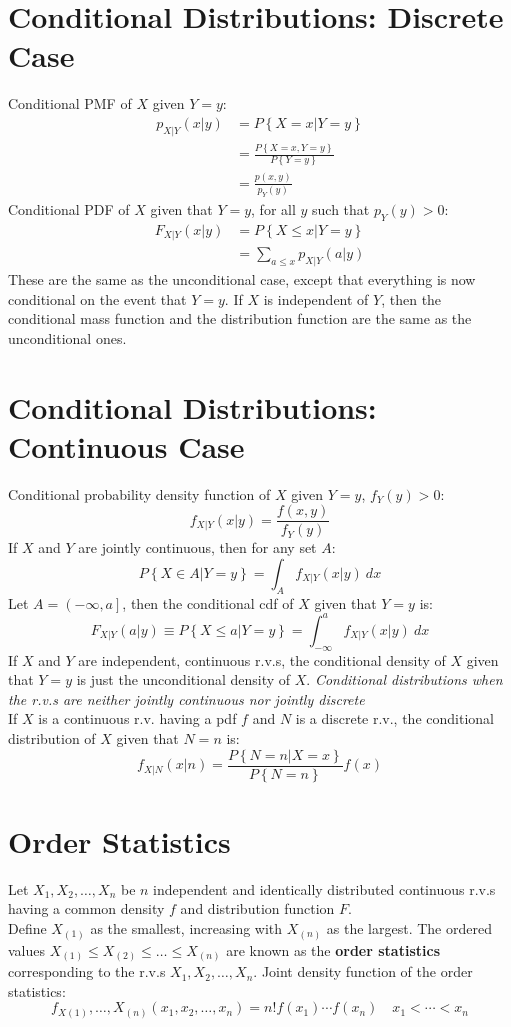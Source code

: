 \documentclass[openany]{book}
\numberwithin{equation}{section}
\begin{document}
\begin{flushleft}
\section{Conditional Distributions: Discrete Case}
Conditional PMF of $X$ given $Y=y$:
\begin{align*}
p_{X|Y}(x|y)&=P\left\{X=x|Y=y \right\}\\
&=\frac{P\left\{X=x,Y=y \right\}}{P\left\{Y=y \right\}}\\
&=\frac{p(x,y)}{p_Y(y)}
\end{align*}
Conditional PDF of $X$ given that $Y=y$, for all $y$ such that $p_Y(y)>0$:
\begin{align*}
F_{X|Y}(x|y)&=P\left\{X \leq x|Y=y \right\}\\
&=\sum_{a \leq x}p_{X|Y}(a|y)
\end{align*}
These are the same as the unconditional case, except that everything is now conditional on the event that $Y=y$. If $X$ is independent of $Y$, then the conditional mass function and the distribution function are the same as the unconditional ones.
\section{Conditional Distributions: Continuous Case}
Conditional probability density function of $X$ given $Y=y$, $f_Y(y)>0$:
\[f_{X|Y}(x|y)=\frac{f(x,y)}{f_Y(y)}
\]
If $X$ and $Y$ are jointly continuous, then for any set $A$:
\[P\left\{X \in A|Y=y \right\} = \int_{A}f_{X|Y}(x|y) \ dx
\]
Let $A=\left(-\infty,a\right]$, then the conditional cdf of $X$ given that $Y=y$ is:
\[F_{X|Y}(a|y)\equiv P\left\{X\leq a|Y=y \right\}=\int_{-\infty}^{a}f_{X|Y}(x|y) \ dx
\]
If $X$ and $Y$ are independent, continuous r.v.s, the conditional density of $X$ given that $Y=y$ is just the unconditional density of $X$. \medbreak
\textit{Conditional distributions when the r.v.s are neither jointly continuous nor jointly discrete}\\
If $X$ is a continuous r.v. having a pdf $f$ and $N$ is a discrete r.v., the conditional distribution of $X$ given that $N=n$ is:
\[f_{X|N}(x|n)=\frac{P\left\{N=n|X=x \right\}}{P\left\{N=n \right\}}f(x)
\]
\section{Order Statistics}
Let $X_1,X_2,\dots,X_n$ be $n$ independent and identically distributed continuous r.v.s having a common density $f$ and distribution function $F$.\\
 Define $X_{(1)}$ as the smallest, increasing with $X_{(n)}$ as the largest. \medbreak
 The ordered values $X_{(1)}\leq X_{(2)}\leq \dots \leq X_{(n)}$ are known as the \textbf{order statistics} corresponding to the r.v.s $X_1,X_2,\dots,X_n$. \medbreak
Joint density function of the order statistics:
\[f_{X(1)},\dots,X_{(n)}(x_1,x_2,\dots,x_n)=n!f(x_1)\cdots f(x_n) \quad x_1<\cdots < x_n
\]



\end{flushleft}
\end{document}
